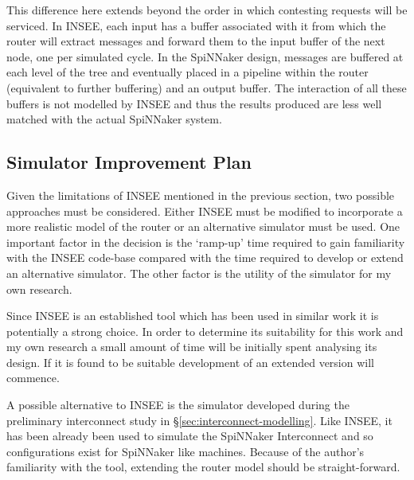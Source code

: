 			This difference here extends beyond the order in which contesting requests
			will be serviced. In INSEE, each input has a buffer associated with it
			from which the router will extract messages and forward them to the input
			buffer of the next node, one per simulated cycle. In the SpiNNaker design,
			messages are buffered at each level of the tree and eventually placed in a
			pipeline within the router (equivalent to further buffering) and an output
			buffer. The interaction of all these buffers is not modelled by INSEE and
			thus the results produced are less well matched with the actual SpiNNaker
			system.
			
		
		\subsection{Simulator Improvement Plan}
			
			Given the limitations of INSEE mentioned in the previous section, two
			possible approaches must be considered. Either INSEE must be modified to
			incorporate a more realistic model of the router or an alternative
			simulator must be used.  One important factor in the decision is the
			`ramp-up' time required to gain familiarity with the INSEE code-base
			compared with the time required to develop or extend an alternative
			simulator. The other factor is the utility of the simulator for my own
			research.
			
			Since INSEE is an established tool which has been used in similar work it
			is potentially a strong choice. In order to determine its suitability for
			this work and my own research a small amount of time will be initially
			spent analysing its design. If it is found to be suitable development of
			an extended version will commence.
			
			A possible alternative to INSEE is the simulator developed during the
			preliminary interconnect study in \S\ref{sec:interconnect-modelling}.
			Like INSEE, it has been already been used to simulate the SpiNNaker
			Interconnect and so configurations exist for SpiNNaker like machines.
			Because of the author's familiarity with the tool, extending the router
			model should be straight-forward.
	
